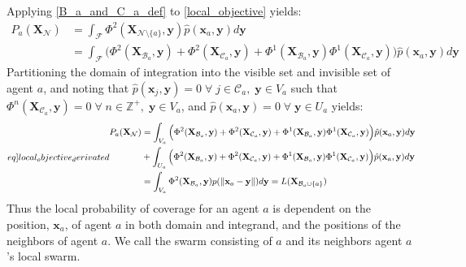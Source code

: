 Applying \eqref{B_a_and_C_a_def} to \eqref{local_objective} yields:
\begin{equation}
  \begin{split}
    P_{a}(\mathbf{X}_{\mathcal{N}}) &= \int_{\mathcal{F}}\Phi^{2}(\mathbf{X}_{\mathcal{N}\setminus\{a\}}, \mathbf{y})\hat{p}(\mathbf{x}_{a}, \mathbf{y})d\mathbf{y}\\
    &= \int_{\mathcal{F}}\Big(\Phi^{2}(\mathbf{X}_{\mathcal{B}_{a}}, \mathbf{y}) + \Phi^{2}(\mathbf{X}_{\mathcal{C}_{a}}, \mathbf{y}) + \Phi^{1}(\mathbf{X}_{\mathcal{B}_{a}}, \mathbf{y})\Phi^{1}(\mathbf{X}_{\mathcal{C}_{a}}, \mathbf{y})\Big)\hat{p}(\mathbf{x}_{a}, \mathbf{y})d\mathbf{y}
  \end{split}
\end{equation}
Partitioning the domain of integration into the visible set and invisible set of agent $a$, and noting that $\hat{p}(\mathbf{x}_{j}, \mathbf{y}) = 0\;\forall\;j\in\mathcal{C}_{a},\;\mathbf{y}\in V_{a}$ such that
$\Phi^{n}(\mathbf{X}_{\mathcal{C}_{a}}, \mathbf{y}) = 0\;\forall\;n\in\mathbb{Z}^{+},\;\mathbf{y}\in V_{a}$, and $\hat{p}(\mathbf{x}_{a}, \mathbf{y}) = 0\;\forall\;\mathbf{y}\in U_{a}$ yields:
\begin{equation}\label[eq]{local_objective_derivated}
  \begin{split}
    P_{a}(\mathbf{X}_{\mathcal{N}}) &= \int_{V_{a}}\Big(\Phi^{2}(\mathbf{X}_{\mathcal{B}_{a}}, \mathbf{y}) + \Phi^{2}(\mathbf{X}_{\mathcal{C}_{a}}, \mathbf{y}) + \Phi^{1}(\mathbf{X}_{\mathcal{B}_{a}}, \mathbf{y})\Phi^{1}(\mathbf{X}_{\mathcal{C}_{a}}, \mathbf{y})\Big)\hat{p}(\mathbf{x}_{a}, \mathbf{y})d\mathbf{y}\\
    &+ \int_{U_{a}}\Big(\Phi^{2}(\mathbf{X}_{\mathcal{B}_{a}}, \mathbf{y}) + \Phi^{2}(\mathbf{X}_{\mathcal{C}_{a}}, \mathbf{y}) + \Phi^{1}(\mathbf{X}_{\mathcal{B}_{a}}, \mathbf{y})\Phi^{1}(\mathbf{X}_{\mathcal{C}_{a}}, \mathbf{y})\Big)\hat{p}(\mathbf{x}_{a}, \mathbf{y})d\mathbf{y}\\
    &= \int_{V_{a}}\Phi^{2}(\mathbf{X}_{\mathcal{B}_{a}}, \mathbf{y})p(\norm{\mathbf{x}_{a}-\mathbf{y}})d\mathbf{y} = L(\mathbf{X}_{\mathcal{B}_{a}\cup\{a\}})
  \end{split}
\end{equation}
Thus the local probability of coverage for an agent $a$ is dependent on the position, $\mathbf{x}_{a}$, of agent $a$ in both domain and integrand, and the positions of the neighbors of agent $a$.
We call the swarm consisting of $a$ and its neighbors agent $a$'s local swarm.\clearpage

